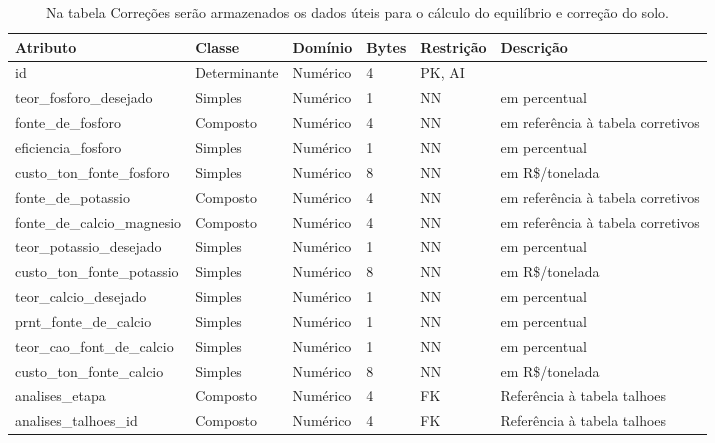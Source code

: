 \begin{landscape}
    \begin{table}[H]
        \centering
        \caption[Tabela \textbf{Correções}]{Na tabela Correções serão armazenados os dados úteis para o cálculo do equilíbrio e correção do solo.
            \label{tab:tabela-er-correcoes}}
        \begin{tabular}{|p{4cm}|p{3cm}|p{2cm}|p{1cm}|p{2cm}|p{8cm}|}
            \hline
            Atributo                    & Classe       & Domínio  & Bytes & Restrição & Descrição                         \\\hline
            id                          & Determinante & Numérico & 4     & PK, AI    &                                   \\\hline
            teor\_fosforo\_desejado     & Simples      & Numérico & 1     & NN        & em percentual                     \\\hline
            fonte\_de\_fosforo          & Composto     & Numérico & 4     & NN        & em referência à tabela corretivos \\\hline
            eficiencia\_fosforo         & Simples      & Numérico & 1     & NN        & em percentual                     \\\hline
            custo\_ton\_fonte\_fosforo  & Simples      & Numérico & 8     & NN        & em R\$/tonelada                   \\\hline
            fonte\_de\_potassio         & Composto     & Numérico & 4     & NN        & em referência à tabela corretivos \\\hline
            fonte\_de\_calcio\_magnesio & Composto     & Numérico & 4     & NN        & em referência à tabela corretivos \\\hline
            teor\_potassio\_desejado    & Simples      & Numérico & 1     & NN        & em percentual                     \\\hline
            custo\_ton\_fonte\_potassio & Simples      & Numérico & 8     & NN        & em R\$/tonelada                   \\\hline
            teor\_calcio\_desejado      & Simples      & Numérico & 1     & NN        & em percentual                     \\\hline
            prnt\_fonte\_de\_calcio     & Simples      & Numérico & 1     & NN        & em percentual                     \\\hline
            teor\_cao\_font\_de\_calcio & Simples      & Numérico & 1     & NN        & em percentual                     \\\hline
            custo\_ton\_fonte\_calcio   & Simples      & Numérico & 8     & NN        & em R\$/tonelada                   \\\hline
            analises\_etapa             & Composto     & Numérico & 4     & FK        & Referência à tabela talhoes       \\\hline
            analises\_talhoes\_id       & Composto     & Numérico & 4     & FK        & Referência à tabela talhoes       \\\hline
        \end{tabular}
    \end{table}


\end{landscape}
